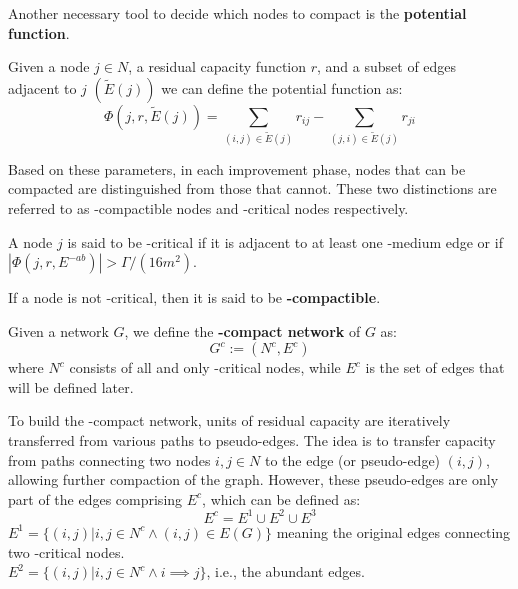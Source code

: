 Another necessary tool to decide which nodes to compact is the \textbf{potential function}.
\begin{definition}

    Given a node $j\in N$, a residual capacity function $r$, and a subset of edges adjacent to $j$ $(\tilde{E}(j))$  we can define the potential function as:
    \[\Phi (j, r, \tilde{E}(j)) = \sum_{(i,j)\in \tilde{E}(j)} r_{ij}-\sum_{(j,i)\in \tilde{E}(j)} r_{ji}\] 
\end{definition}

Based on these parameters, in each improvement phase, nodes that can be compacted are distinguished from those that cannot. These two distinctions are referred to as \gmm-compactible nodes and \gmm-critical nodes respectively.
    \begin{definition}
        
        A node $j$ is said to be \gmm-critical if it is adjacent to at least one \gmm-medium edge or if  $|\Phi (j, r, E^{-ab})| > \Gamma/(16m^2)$.

        If a node is not \gmm-critical, then it is said to be \textbf{\gmm-compactible}.

        
        Given a network $G$, we define the \textbf{\gmm-compact network} of $G$ as: \[G^c := (N^c, E^c)\]
        where $N^c$ consists of all and only \gmm-critical nodes, while $E^c$ is the set of edges that will be defined later.
    \end{definition}
    To build the \gmm-compact network, units of residual capacity are iteratively transferred from various paths to pseudo-edges. The idea is to transfer capacity from paths connecting two nodes $i,j\in N$ to the edge (or pseudo-edge) $(i,j)$, allowing further compaction of the graph.
    However, these pseudo-edges are only part of the edges comprising $E^c$, which can be defined as:
    \[E^c = E^1\cup E^2 \cup E^3\]
    $E^1 = \{(i,j) | i,j\in N^c \land (i,j) \in E(G)\}$ meaning the original edges connecting two \gmm-critical nodes.\\
    $E^2 = \{(i,j) | i,j\in N^c \land i\implies j\}$, i.e., the abundant edges.

